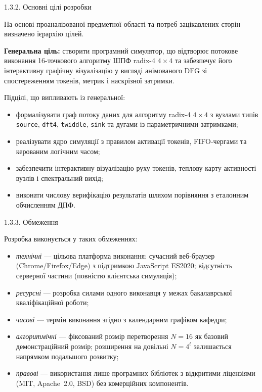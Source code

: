 1.3.2. Основні цілі розробки

На основі проаналізованої предметної області та потреб зацікавлених
сторін визначено ієрархію цілей.

\textbf{Генеральна ціль:} створити програмний симулятор, що відтворює
потокове виконання 16-точкового алгоритму ШПФ radix-4 \(4 \times 4\) та
забезпечує його інтерактивну графічну візуалізацію у вигляді анімованого
DFG зі спостереженням токенів, метрик і наскрізної затримки.

Підцілі, що випливають із генеральної:

\begin{itemize}
\item
  формалізувати граф потоку даних для алгоритму radix-4 \(4 \times 4\) з
  вузлами типів \texttt{source}, \texttt{dft4}, \texttt{twiddle},
  \texttt{sink} та дугами із параметричними затримками;
\item
  реалізувати ядро симуляції з правилом активації токенів, FIFO-чергами
  та керованим логічним часом;
\item
  забезпечити інтерактивну візуалізацію руху токенів, теплову карту
  активності вузлів і спектральний вихід;
\item
  виконати числову верифікацію результатів шляхом порівняння з еталонним
  обчисленням ДПФ.
\end{itemize}

1.3.3. Обмеження

Розробка виконується у таких обмеженнях:

\begin{itemize}
\item
  \emph{технічні} --- цільова платформа виконання: сучасний веб-браузер
  (Chrome/Firefox/Edge) з підтримкою JavaScript ES2020; відсутність
  серверної частини (повністю клієнтська симуляція);
\item
  \emph{ресурсні} --- розробка силами одного виконавця у межах
  бакалаврської кваліфікаційної роботи;
\item
  \emph{часові} --- термін виконання згідно з календарним графіком
  кафедри;
\item
  \emph{алгоритмічні} --- фіксований розмір перетворення \(N = 16\) як
  базовий демонстраційний розмір; розширення на довільні \(N = 4^{t}\)
  залишається напрямком подальшого розвитку;
\item
  \emph{правові} --- використання лише програмних бібліотек з відкритими
  ліцензіями (MIT, Apache~2.0, BSD) без комерційних компонентів.
\end{itemize}

